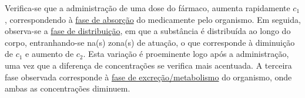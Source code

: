 \vspace{1em}
Verifica-se que a administração de uma dose do fármaco, aumenta rapidamente $c_1$, correspondendo à \underline{fase de absorção} do medicamente pelo organismo. Em seguida,  observa-se a \underline{fase de distribuição}, em que a substância é distribuída ao longo do corpo, entranhando-se na(s) zona(s) de atuação, o que corresponde à diminuição de $c_1$ e aumento de $c_2$. Esta variação é proeminente logo após a administração, uma vez que a diferença de concentrações se verifica mais acentuada. A terceira fase observada corresponde à \underline{fase de excreção/metabolismo} do organismo, onde ambas as concentrações diminuem.

